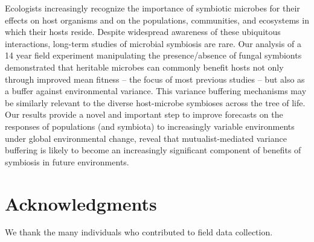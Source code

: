 \documentclass[12pt]{article}
\begin{document}
Ecologists increasingly recognize the importance of symbiotic microbes for their effects on host organisms and on the populations, communities, and ecosystems in which their hosts reside.
Despite widespread awareness of these ubiquitous interactions, long-term studies of microbial symbiosis are rare. 
Our analysis of a 14 year field experiment manipulating the presence/absence of fungal symbionts demonstrated that heritable microbes can commonly benefit hosts not only through improved mean fitness -- the focus of most previous studies -- but also as a buffer against environmental variance. 
This variance buffering mechanisms may be similarly relevant to the diverse host-microbe symbioses across the tree of life.
Our results provide a novel and important step to improve forecasts on the responses of populations (and symbiota) to increasingly variable environments under global environmental change, reveal that mutualist-mediated variance buffering is likely to become an increasingly significant component of benefits of symbiosis in future environments.














\section*{Acknowledgments}
We thank the many individuals who contributed to field data collection.

\end{document}
